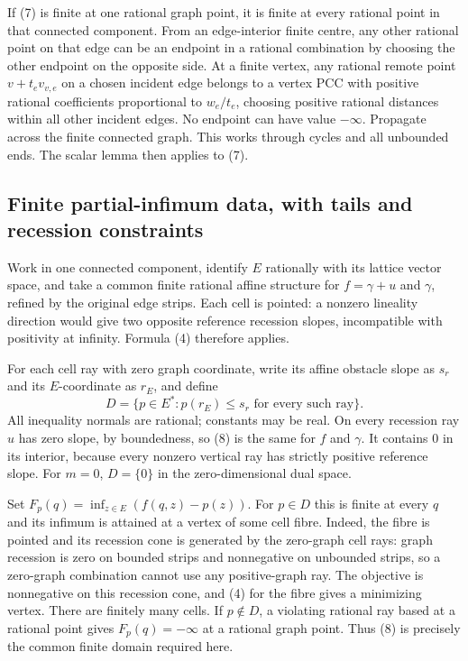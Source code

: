 \documentclass[
  11pt,
]{article}
\begin{document}
If (7) is finite at one rational graph point, it is finite at every
rational point in that connected component. From an edge-interior finite
centre, any other rational point on that edge can be an endpoint in a
rational combination by choosing the other endpoint on the opposite
side. At a finite vertex, any rational remote point \(v+t_ev_{v,e}\) on
a chosen incident edge belongs to a vertex PCC with positive rational
coefficients proportional to \(w_e/t_e\), choosing positive rational
distances within all other incident edges. No endpoint can have value
\(-\infty\). Propagate across the finite connected graph. This works
through cycles and all unbounded ends. The scalar lemma then applies to
(7).

\subsection{Finite partial-infimum data, with tails and recession
constraints}\label{finite-partial-infimum-data-with-tails-and-recession-constraints}

Work in one connected component, identify \(E\) rationally with its
lattice vector space, and take a common finite rational affine structure
for \(f=\gamma+u\) and \(\gamma\), refined by the original edge strips.
Each cell is pointed: a nonzero lineality direction would give two
opposite reference recession slopes, incompatible with positivity at
infinity. Formula (4) therefore applies.

For each cell ray with zero graph coordinate, write its affine obstacle
slope as \(s_r\) and its \(E\)-coordinate as \(r_E\), and define \[
 D=\{p\in E^*:p(r_E)\leq s_r\text{ for every such ray}\}.                    \tag{8}
\] All inequality normals are rational; constants may be real. On every
recession ray \(u\) has zero slope, by boundedness, so (8) is the same
for \(f\) and \(\gamma\). It contains 0 in its interior, because every
nonzero vertical ray has strictly positive reference slope. For \(m=0\),
\(D=\{0\}\) in the zero-dimensional dual space.

Set \(F_p(q)=\inf_{z\in E}(f(q,z)-p(z))\). For \(p\in D\) this is finite
at every \(q\) and its infimum is attained at a vertex of some cell
fibre. Indeed, the fibre is pointed and its recession cone is generated
by the zero-graph cell rays: graph recession is zero on bounded strips
and nonnegative on unbounded strips, so a zero-graph combination cannot
use any positive-graph ray. The objective is nonnegative on this
recession cone, and (4) for the fibre gives a minimizing vertex. There
are finitely many cells. If \(p\notin D\), a violating rational ray
based at a rational point gives \(F_p(q)=-\infty\) at a rational graph
point. Thus (8) is precisely the common finite domain required here.
\end{document}
